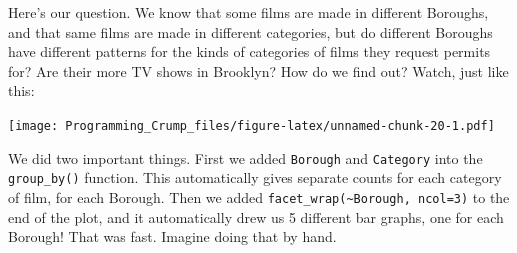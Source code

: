 \documentclass[]{book}
\newenvironment{Shaded}{\begin{snugshade}}{\end{snugshade}}
\newcommand{\KeywordTok}[1]{\textcolor[rgb]{0.13,0.29,0.53}{\textbf{{#1}}}}
\newcommand{\DataTypeTok}[1]{\textcolor[rgb]{0.13,0.29,0.53}{{#1}}}
\newcommand{\DecValTok}[1]{\textcolor[rgb]{0.00,0.00,0.81}{{#1}}}
\newcommand{\StringTok}[1]{\textcolor[rgb]{0.31,0.60,0.02}{{#1}}}
\newcommand{\CommentTok}[1]{\textcolor[rgb]{0.56,0.35,0.01}{\textit{{#1}}}}
\newcommand{\NormalTok}[1]{{#1}}
\theoremstyle{definition}
\theoremstyle{definition}
\theoremstyle{definition}
\theoremstyle{remark}
\begin{document}
Here's our question. We know that some films are made in different
Boroughs, and that same films are made in different categories, but do
different Boroughs have different patterns for the kinds of categories
of films they request permits for? Are their more TV shows in Brooklyn?
How do we find out? Watch, just like this:

\begin{Shaded}
\end{Shaded}

\texttt{[image: Programming\_Crump\_files/figure-latex/unnamed-chunk-20-1.pdf]}

We did two important things. First we added \texttt{Borough} and
\texttt{Category} into the \texttt{group\_by()} function. This
automatically gives separate counts for each category of film, for each
Borough. Then we added
\texttt{facet\_wrap(\textasciitilde{}Borough,\ ncol=3)} to the end of
the plot, and it automatically drew us 5 different bar graphs, one for
each Borough! That was fast. Imagine doing that by hand.
\end{document}
